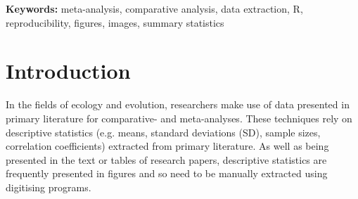 \documentclass[12pt]{article}
\let\proglang=\textsf
\begin{document}
\vskip10pt
 \textbf{Keywords:} meta-analysis, comparative analysis, data extraction, \proglang{R}, reproducibility, figures, images, summary statistics




\clearpage



\section{Introduction}



In the fields of ecology and evolution, researchers make use of data presented in primary literature for comparative- and meta-analyses. These techniques rely on descriptive statistics (e.g. means, standard deviations (SD), sample sizes, correlation coefficients) extracted from primary literature. As well as being presented in the text or tables of research papers, descriptive statistics are frequently presented in figures and so need to be manually extracted using digitising programs. 
\end{document}
